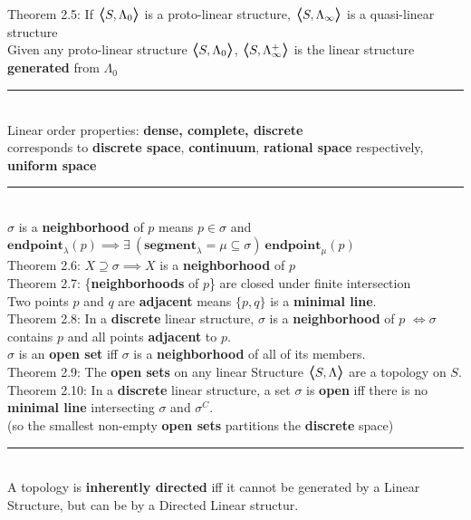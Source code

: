 \documentclass{article}
\newcommand{\hcm}[1][1]{\hspace{#1 cm}}
\newcommand{\bra}[1][1.2]{\scalebox{#1}{$\boldsymbol{\langle}$}}
\newcommand{\nl}[1][12]{\\[#1pt]}
\newcommand{\ket}[1][1.2]{\scalebox{#1}{$\boldsymbol{\rangle}$}}
\newcommand {\chb}[1]{\textbf{#1}}
\begin{document}
\begin{flushleft}
\hcm Theorem 2.5: If $\bra S, \Lambda_0\ket$ is a proto-linear structure, $\bra S, \Lambda_\infty\ket$ is a quasi-linear structure\nl[10]

Given any proto-linear structure $\bra S, \Lambda_0\ket$, $\bra S, \Lambda_\infty^+\ket$ is the linear structure \chb{generated} from $\Lambda_0$\nl[10]

\par\noindent\rule{\textwidth}{0.4pt}\nl[5] %

Linear order properties: \chb{dense, complete, discrete}\\
corresponds to \chb{discrete space}, \chb{continuum}, \chb{rational space} respectively, \chb{uniform space}\nl[10]

\par\noindent\rule{\textwidth}{0.4pt}\nl[5] %

$\sigma$ is a \chb{neighborhood} of $p$ means $p \in \sigma$ and $\chb{endpoint}_\lambda(p) \implies \exists\  (\chb{segment}_\lambda = \mu \subseteq \sigma) \ \chb{endpoint}_\mu(p)$\nl[10]

\hcm Theorem 2.6: $X\supseteq \sigma \implies X$ is a \chb{neighborhood} of $p$\nl[5]

\hcm Theorem 2.7: \{\chb{neighborhoods} of $p$\} are closed under finite intersection\nl[10]

Two points $p$ and $q$ are \chb{adjacent} means $\{p, q\}$ is a \chb{minimal line}.\nl

\hcm Theorem 2.8: In a \chb{discrete} linear structure, $\sigma$ is a \chb{neighborhood} of $p$ $\iff \sigma$ contains $p$ and all points \chb{adjacent} to $p$.\nl

$\sigma$ is an \chb{open set} iff $\sigma$ is a \chb{neighborhood} of all of its members.\nl

\hcm Theorem 2.9: The \chb{open sets} on any linear Structure  $\bra S, \Lambda\ket$ are a topology on $S$.\nl

\hcm Theorem 2.10: In a \chb{discrete} linear structure, a set $\sigma$ is \chb{open} iff there is no \chb{minimal line} intersecting $\sigma$ and $\sigma^C$.\nl[3]
\hcm (so the smallest non-empty \chb{open sets} partitions the \chb{discrete} space)\nl[10]

\par\noindent\rule{\textwidth}{0.4pt}\nl[5] %

A topology is \chb{inherently directed} iff it cannot be generated by a Linear Structure, but can be by a Directed Linear structur.\nl[10]


\end{flushleft}
\end{document}
